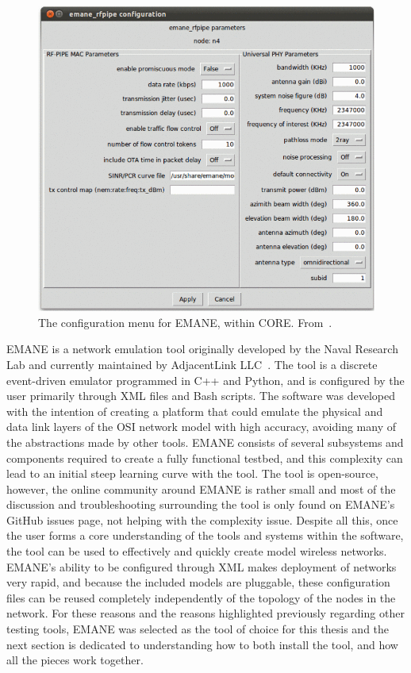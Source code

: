 \begin{figure}[!ht]
    \centering
    \includegraphics[width=\textwidth,keepaspectratio]{Images/Chpt2/core_emane.png}
    \caption{The configuration menu for EMANE, within CORE. From~\cite{emane_core}.}
    \label{core_emane}
\end{figure}

EMANE is a network emulation tool originally developed by the Naval Research Lab and currently maintained by AdjacentLink LLC~\cite{emane_nrl}.
The tool is a discrete event-driven emulator programmed in C++ and Python, and is configured by the user primarily through XML files and Bash scripts.
The software was developed with the intention of creating a platform that could emulate the physical and data link layers of the OSI network model with high accuracy, avoiding many of the abstractions made by other tools.
EMANE consists of several subsystems and components required to create a fully functional testbed, and this complexity can lead to an initial steep learning curve with the tool.
The tool is open-source, however, the online community around EMANE is rather small and most of the discussion and troubleshooting surrounding the tool is only found on EMANE's GitHub issues page, not helping with the complexity issue.
Despite all this, once the user forms a core understanding of the tools and systems within the software, the tool can be used to effectively and quickly create model wireless networks.
EMANE's ability to be configured through XML makes deployment of networks very rapid, and because the included models are pluggable, these configuration files can be reused completely independently of the topology of the nodes in the network.
For these reasons and the reasons highlighted previously regarding other testing tools, EMANE was selected as the tool of choice for this thesis and the next section is dedicated to understanding how to both install the tool, and how all the pieces work together. \par

